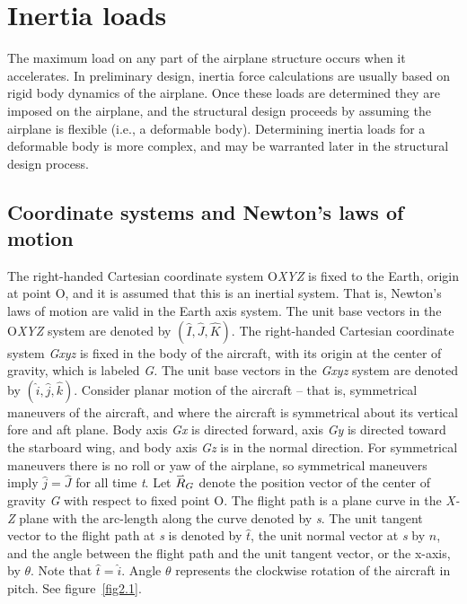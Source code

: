 \documentclass{AeroStructure-ERJohnson}
\def\harp#1{\smash{\mathord{\buildrel{\lower3pt\hbox{$\scriptscriptstyle\rightharpoonup$}}\over{#1}}}}
\begin{document}
\section{Inertia loads}\label{sec2.2}

The maximum load on any part of the airplane structure occurs when it accelerates. In preliminary design, inertia force calculations are usually based on rigid body dynamics of the airplane. Once these loads are determined they are imposed on the airplane, and the structural design proceeds by assuming the airplane is flexible (i.e., a deformable body). Determining inertia loads for a deformable body is more complex, and may be warranted later in the structural design process.

\subsection{Coordinate systems and Newton's laws of motion}\label{sec2.2.1}

The right-handed Cartesian coordinate system O\textit{XYZ} is fixed to the Earth, origin at point O, and it is assumed that this is an inertial system. That is, Newton's laws of motion are valid in the Earth axis system. The unit base vectors in the O\textit{XYZ} system are denoted by $(\hat{I}, \hat{J}, \hat{K})$. The right-handed Cartesian coordinate system \textit{Gxyz} is fixed in the body of the aircraft, with its origin at the center of gravity, which is labeled \textit{G. }The unit base vectors in the \textit{Gxyz} system are denoted by $(\hat{i}, \hat{j}, \hat{k})$. Consider planar motion of the aircraft -- that is, symmetrical maneuvers of the aircraft, and where the aircraft is symmetrical about its vertical fore and aft plane. Body axis \textit{Gx} is directed forward, axis \textit{Gy} is directed toward the starboard wing, and body axis \textit{Gz} is in the normal direction. For symmetrical maneuvers there is no roll or yaw of the airplane, so symmetrical maneuvers imply $\hat{j}=\hat{J}$ for all time \textit{t}. Let $\harp{R}_{G}$ denote the position vector of the center of gravity \textit{G} with respect to fixed point O. The flight path is a plane curve in the \textit{X-Z} plane with the arc-length along the curve denoted by \textit{s}. The unit tangent vector to the flight path at \textit{s} is denoted by $\hat{t}$, the unit normal vector at \textit{s} by $\hat{n}$, and the angle between the flight path and the unit tangent vector, or the x-axis, by $\theta$. Note that $\hat{t}=\hat{i}$. Angle $\theta$ represents the clockwise rotation of the aircraft in pitch. See figure~\ref{fig2.1}.
\end{document}
